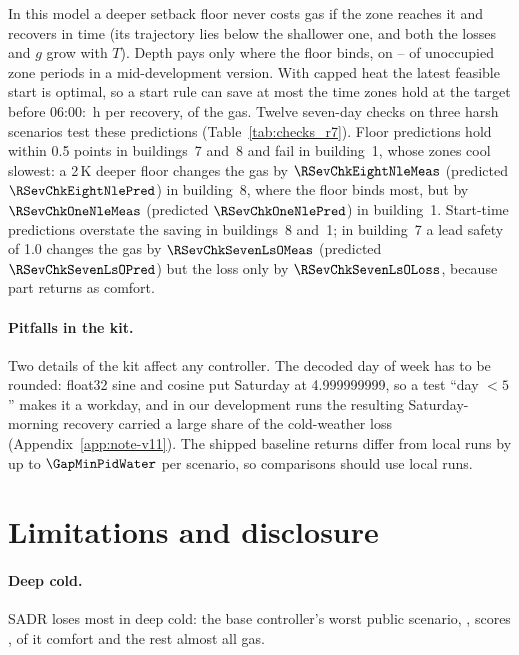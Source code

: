 In this model a deeper setback floor never costs gas if the zone reaches it and recovers in time (its trajectory lies below the shallower one, and both the losses and $g$ grow with $T$). Depth pays only where the floor binds, on \RSevBindLo--\RSevBindHi{} of unoccupied zone periods in a mid-development version. With capped heat the latest feasible start is optimal, so a start rule can save at most the time zones hold at the target before 06:00: \RSevHoldH\,h per recovery, \RSevHoldGas{} of the gas. Twelve seven-day checks on three harsh scenarios test these predictions (Table~\ref{tab:checks_r7}). Floor predictions hold within 0.5 points in buildings~7 and~8 and fail in building~1, whose zones cool slowest: a 2\,K deeper floor changes the gas by $\RSevChkEightNleMeas$ (predicted $\RSevChkEightNlePred$) in building~8, where the floor binds most, but by $\RSevChkOneNleMeas$ (predicted $\RSevChkOneNlePred$) in building~1. Start-time predictions overstate the saving in buildings~8 and~1; in building~7 a lead safety of 1.0 changes the gas by $\RSevChkSevenLsOMeas$ (predicted $\RSevChkSevenLsOPred$) but the loss only by $\RSevChkSevenLsOLoss$, because part returns as comfort.

\paragraph{Pitfalls in the kit.} Two details of the kit affect any controller. The decoded day of week has to be rounded: float32 sine and cosine put Saturday at 4.999999999, so a test ``day $<5$'' makes it a workday, and in our development runs the resulting Saturday-morning recovery carried a large share of the cold-weather loss (Appendix~\ref{app:note-v11}). The shipped baseline returns differ from local runs by up to $\GapMinPidWater$ per scenario, so comparisons should use local runs.

\section{Limitations and disclosure}
\label{sec:limits}
\paragraph{Deep cold.} SADR loses most in deep cold: the base controller's worst public scenario, \RElvWorstPubScen, scores \RElvWorstPub, \RElvWorstPubComfortShare{} of it comfort and the rest almost all gas.

